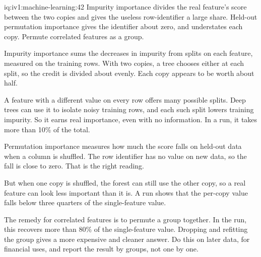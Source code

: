 \begin{solution}{iq:iv1:machine-learning:42}
Impurity importance divides the real feature's score between the two copies and gives the useless row-identifier a large share. Held-out permutation importance gives the identifier about zero, and understates each copy. Permute correlated features as a group.

Impurity importance sums the decreases in impurity from splits on each feature, measured on the training rows. With two copies, a tree chooses either at each split, so the credit is divided about evenly. Each copy appears to be worth about half.

A feature with a different value on every row offers many possible splits. Deep trees can use it to isolate noisy training rows, and each such split lowers training impurity. So it earns real importance, even with no information. In a run, it takes more than 10\% of the total.

Permutation importance measures how much the score falls on held-out data when a column is shuffled. The row identifier has no value on new data, so the fall is close to zero. That is the right reading.

But when one copy is shuffled, the forest can still use the other copy, so a real feature can look less important than it is. A run shows that the per-copy value falls below three quarters of the single-feature value.

The remedy for correlated features is to permute a group together. In the run, this recovers more than 80\% of the single-feature value. Dropping and refitting the group gives a more expensive and cleaner answer. Do this on later data, for financial uses, and report the result by groups, not one by one.



\end{solution}

